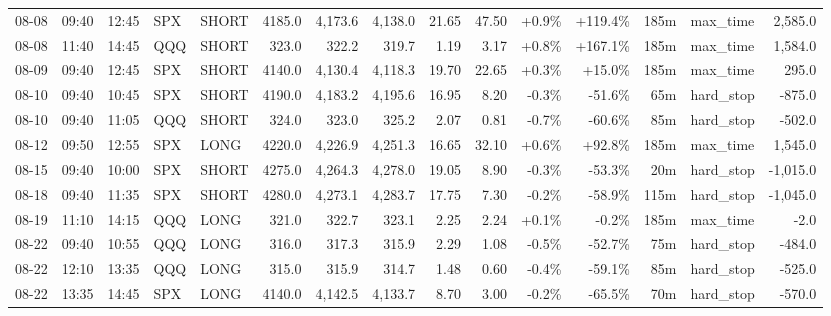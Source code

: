 \documentclass[11pt,a4paper,twoside]{article}
\begin{document}
\begin{landscape}
\begin{center}
\begin{longtable}{>{\color{txtmain}}l l l l l r r r r r r r r >{\color{txtmain}}l r}
08-08 & 09:40 & 12:45 & SPX & SHORT & 4185.0 & 4,173.6 & 4,138.0 & 21.65 & 47.50 & \textcolor{wingreen}{+0.9\%} & \textcolor{wingreen}{+119.4\%} & 185m & max\_time & \textcolor{wingreen}{2,585.0} \\
08-08 & 11:40 & 14:45 & QQQ & SHORT & 323.0 & 322.2 & 319.7 & 1.19 & 3.17 & \textcolor{wingreen}{+0.8\%} & \textcolor{wingreen}{+167.1\%} & 185m & max\_time & \textcolor{wingreen}{1,584.0} \\
08-09 & 09:40 & 12:45 & SPX & SHORT & 4140.0 & 4,130.4 & 4,118.3 & 19.70 & 22.65 & \textcolor{wingreen}{+0.3\%} & \textcolor{wingreen}{+15.0\%} & 185m & max\_time & \textcolor{wingreen}{295.0} \\
08-10 & 09:40 & 10:45 & SPX & SHORT & 4190.0 & 4,183.2 & 4,195.6 & 16.95 & 8.20 & \textcolor{lossred}{-0.3\%} & \textcolor{lossred}{-51.6\%} & 65m & hard\_stop & \textcolor{lossred}{-875.0} \\
08-10 & 09:40 & 11:05 & QQQ & SHORT & 324.0 & 323.0 & 325.2 & 2.07 & 0.81 & \textcolor{lossred}{-0.7\%} & \textcolor{lossred}{-60.6\%} & 85m & hard\_stop & \textcolor{lossred}{-502.0} \\
08-12 & 09:50 & 12:55 & SPX & LONG & 4220.0 & 4,226.9 & 4,251.3 & 16.65 & 32.10 & \textcolor{wingreen}{+0.6\%} & \textcolor{wingreen}{+92.8\%} & 185m & max\_time & \textcolor{wingreen}{1,545.0} \\
08-15 & 09:40 & 10:00 & SPX & SHORT & 4275.0 & 4,264.3 & 4,278.0 & 19.05 & 8.90 & \textcolor{lossred}{-0.3\%} & \textcolor{lossred}{-53.3\%} & 20m & hard\_stop & \textcolor{lossred}{-1,015.0} \\
08-18 & 09:40 & 11:35 & SPX & SHORT & 4280.0 & 4,273.1 & 4,283.7 & 17.75 & 7.30 & \textcolor{lossred}{-0.2\%} & \textcolor{lossred}{-58.9\%} & 115m & hard\_stop & \textcolor{lossred}{-1,045.0} \\
08-19 & 11:10 & 14:15 & QQQ & LONG & 321.0 & 322.7 & 323.1 & 2.25 & 2.24 & \textcolor{wingreen}{+0.1\%} & \textcolor{lossred}{-0.2\%} & 185m & max\_time & \textcolor{lossred}{-2.0} \\
08-22 & 09:40 & 10:55 & QQQ & LONG & 316.0 & 317.3 & 315.9 & 2.29 & 1.08 & \textcolor{lossred}{-0.5\%} & \textcolor{lossred}{-52.7\%} & 75m & hard\_stop & \textcolor{lossred}{-484.0} \\
08-22 & 12:10 & 13:35 & QQQ & LONG & 315.0 & 315.9 & 314.7 & 1.48 & 0.60 & \textcolor{lossred}{-0.4\%} & \textcolor{lossred}{-59.1\%} & 85m & hard\_stop & \textcolor{lossred}{-525.0} \\
08-22 & 13:35 & 14:45 & SPX & LONG & 4140.0 & 4,142.5 & 4,133.7 & 8.70 & 3.00 & \textcolor{lossred}{-0.2\%} & \textcolor{lossred}{-65.5\%} & 70m & hard\_stop & \textcolor{lossred}{-570.0} \\

\end{longtable}
\end{center}
\end{landscape}
\end{document}
